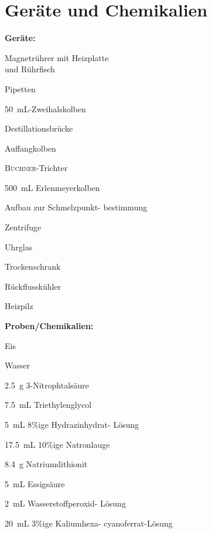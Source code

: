 \section{Geräte und Chemikalien}
\label{sec:geraete}

\textbf{Geräte:}
\begin{itemize}
	\begin{minipage}{0.45\textwidth}
		\item Magnetrührer mit Heizplatte \\ und Rührfisch
		\item Pipetten
		\item \SI{50}{\milli \liter}-Zweihalskolben
		\item Destillationsbrücke
		\item Auffangkolben
		\item \textsc{Büchner}-Trichter
		\item \SI{500}{\milli \liter} Erlenmeyerkolben
	\end{minipage}
	\begin{minipage}{0.45\textwidth}
		\item Aufbau zur Schmelzpunkt- bestimmung
		\item Zentrifuge
		\item Uhrglas
		\item Trockenschrank
		\item Rückflusskühler
		\item Heizpilz
	\end{minipage}
\end{itemize}

\newpage

\textbf{Proben/Chemikalien:}
\begin{itemize}
	\begin{minipage}{0.42 \textwidth}
		\item Eis
		\item Wasser
		\item \SI{2,5}{\gram} 3-Nitrophtalsäure
		\item \SI{7,5}{\milli \liter} Triethylenglycol
		\item \SI{5}{\milli \liter} 8\%ige Hydrazinhydrat- \mbox{Lösung}
	\end{minipage}
\hfill
\begin{minipage}{0.42 \textwidth}
		\item \SI{17,5}{\milli \liter} 10\%ige Natronlauge
		\item \SI{8,4}{\gram} Natriumdithionit
		\item \SI{5}{\milli \liter} Essigsäure
		\item \SI{2}{\milli \liter} Wasserstoffperoxid- Lösung
		\item \SI{20}{\milli \liter} 3\%ige Kaliumhexa- cyanoferrat-Lösung
\end{minipage}
\end{itemize}



